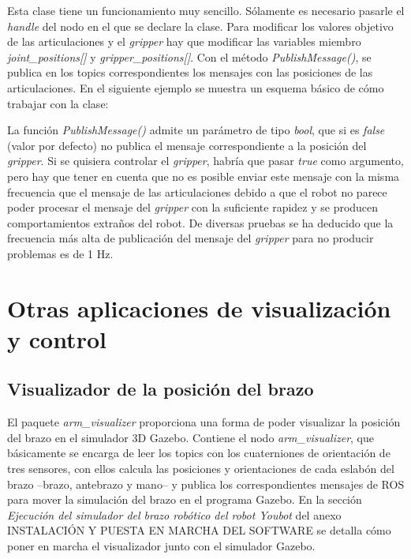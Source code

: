 \documentclass[12pt, a4paper]{report}
\begin{document}
Esta clase tiene un funcionamiento muy sencillo. Sólamente es necesario pasarle el \textit{handle} del nodo en el que se declare la clase. Para modificar los valores objetivo de las articulaciones y el \textit{gripper} hay que modificar las variables miembro \textit{joint\_positions[]} y \textit{gripper\_positions[]}. Con el método \textit{PublishMessage()}, se publica en los topics correspondientes los mensajes con las posiciones de las articulaciones. En el siguiente ejemplo se muestra un esquema básico de cómo trabajar con la clase:\\

\lstset{inputencoding=utf8/latin1}


La función \textit{PublishMessage()} admite un parámetro de tipo \textit{bool}, que si es \textit{false} (valor por defecto) no publica el mensaje correspondiente a la posición del \textit{gripper}. Si se quisiera controlar el \textit{gripper}, habría que pasar \textit{true} como argumento, pero hay que tener en cuenta que no es posible enviar este mensaje con la misma frecuencia que el mensaje de las articulaciones debido a que el robot no parece poder procesar el mensaje del \textit{gripper} con la suficiente rapidez y se producen comportamientos extraños del robot. De diversas pruebas se ha deducido que la frecuencia más alta de publicación del mensaje del \textit{gripper} para no producir problemas es de 1 Hz.

\section{Otras aplicaciones de visualización y control}

\subsection{Visualizador de la posición del brazo}

El paquete \textit{arm\_visualizer} proporciona una forma de poder visualizar la posición del brazo en el simulador 3D Gazebo. Contiene el nodo \textit{arm\_visualizer}, que básicamente se encarga de leer los topics con los cuaterniones de orientación de tres sensores, con ellos calcula las posiciones y orientaciones de cada eslabón del brazo --brazo, antebrazo y mano-- y publica los correspondientes mensajes de ROS para mover la simulación del brazo en el programa Gazebo. En la sección \textit{Ejecución del simulador del brazo robótico del robot Youbot} del anexo INSTALACIÓN Y PUESTA EN MARCHA DEL SOFTWARE se detalla cómo poner en marcha el visualizador junto con el simulador Gazebo.
\end{document}
